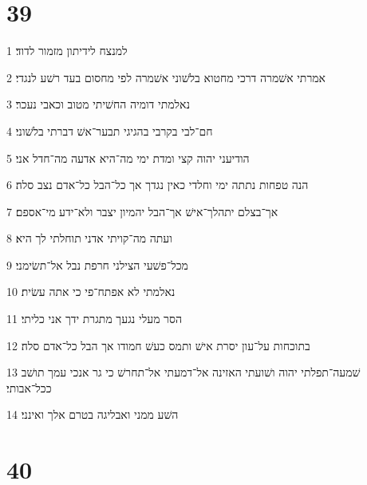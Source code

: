 \chapter{39}

\par 1 למנצח לידיתון מזמור לדוד׃
\par 2 אמרתי אשׁמרה דרכי מחטוא בלשׁוני אשׁמרה לפי מחסום בעד רשׁע לנגדי׃
\par 3 נאלמתי דומיה החשׁיתי מטוב וכאבי נעכר׃
\par 4 חם־לבי בקרבי בהגיגי תבער־אשׁ דברתי בלשׁוני׃
\par 5 הודיעני יהוה קצי ומדת ימי מה־היא אדעה מה־חדל אני׃
\par 6 הנה טפחות נתתה ימי וחלדי כאין נגדך אך כל־הבל כל־אדם נצב סלה׃
\par 7 אך־בצלם יתהלך־אישׁ אך־הבל יהמיון יצבר ולא־ידע מי־אספם׃
\par 8 ועתה מה־קויתי אדני תוחלתי לך היא׃
\par 9 מכל־פשׁעי הצילני חרפת נבל אל־תשׂימני׃
\par 10 נאלמתי לא אפתח־פי כי אתה עשׂית׃
\par 11 הסר מעלי נגעך מתגרת ידך אני כליתי׃
\par 12 בתוכחות על־עון יסרת אישׁ ותמס כעשׁ חמודו אך הבל כל־אדם סלה׃
\par 13 שׁמעה־תפלתי יהוה ושׁועתי האזינה אל־דמעתי אל־תחרשׁ כי גר אנכי עמך תושׁב ככל־אבותי׃
\par 14 השׁע ממני ואבליגה בטרם אלך ואינני׃

\chapter{40}

